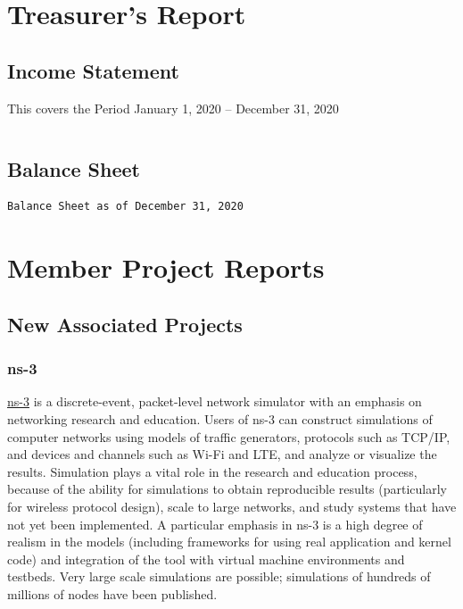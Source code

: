 \documentclass[a4paper]{report}
\begin{document}
\chapter{Treasurer's Report}

\section{Income Statement}

This covers the Period January 1, 2020 -- December 31, 2020

\begin{verbatim}
\end{verbatim}

\section{Balance Sheet}

\begin{verbatim}
Balance Sheet as of December 31, 2020
\end{verbatim}

\chapter{Member Project Reports}

\section{New Associated Projects}

\subsection{ns-3}

\href{https://www.nsnam.org/}{ns-3} is a discrete-event, packet-level network simulator with an emphasis on networking research and education. Users of ns-3 can construct simulations of computer networks using models of traffic generators, protocols such as TCP/IP, and devices and channels such as Wi-Fi and LTE, and analyze or visualize the results. Simulation plays a vital role in the research and education process, because of the ability for simulations to obtain reproducible results (particularly for wireless protocol design), scale to large networks, and study systems that have not yet been implemented. A particular emphasis in ns-3 is a high degree of realism in the models (including frameworks for using real application and kernel code) and integration of the tool with virtual machine environments and testbeds. Very large scale simulations are possible; simulations of hundreds of millions of nodes have been published.
\end{document}
